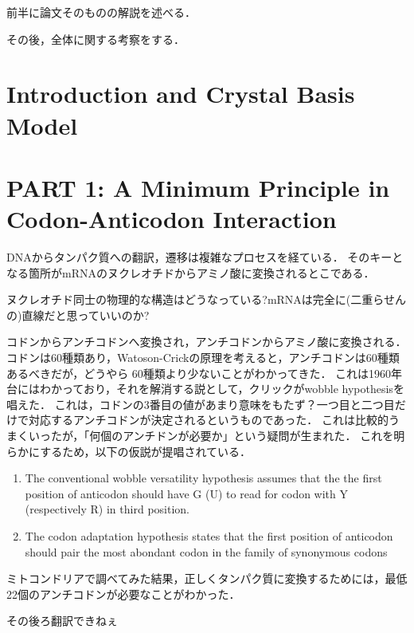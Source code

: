 \documentclass{ujarticle}
\begin{document}
前半に論文そのものの解説を述べる．

その後，全体に関する考察をする．

\section{Introduction and Crystal Basis Model}
\label{sec:Introduction and Crystal Basis Model}

\section{PART 1: A Minimum Principle in Codon-Anticodon
Interaction}
\label{sec:PART 1: A Minimum Principle in Codon-Anticodon
Interaction}
DNAからタンパク質への翻訳，遷移は複雑なプロセスを経ている．
そのキーとなる箇所がmRNAのヌクレオチドからアミノ酸に変換されるとこである．
\begin{yodan}
 ヌクレオチド同士の物理的な構造はどうなっている?mRNAは完全に(二重らせんの)直線だと思っていいのか?
\end{yodan}
コドンからアンチコドンへ変換され，アンチコドンからアミノ酸に変換される．
コドンは60種類あり，Watoson-Crickの原理を考えると，アンチコドンは60種類あるべきだが，どうやら
60種類より少ないことがわかってきた．
これは1960年台にはわかっており，それを解消する説として，クリックがwobble hypothesisを唱えた．
これは，コドンの3番目の値があまり意味をもたず？一つ目と二つ目だけで対応するアンチコドンが決定されるというものであった．
これは比較的うまくいったが，「何個のアンチドンが必要か」という疑問が生まれた．
これを明らかにするため，以下の仮説が提唱されている．
\begin{enumerate}
  \item The conventional wobble versatility hypothesis assumes that the the first position
  of anticodon should have G (U) to read for codon with Y (respectively R) in third position.
  \item The codon adaptation hypothesis states that the first position of anticodon
  should pair the most abondant codon in the family of synonymous codons
\end{enumerate}
ミトコンドリアで調べてみた結果，正しくタンパク質に変換するためには，最低22個のアンチコドンが必要なことがわかった．
\begin{yodan}
 その後ろ翻訳できねぇ
\end{yodan}
\end{document}
